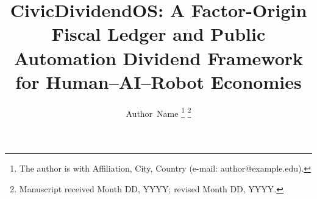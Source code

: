 \documentclass[journal]{IEEEtran}
\theoremstyle{plain}
\theoremstyle{definition}
\begin{document}
\title{CivicDividendOS: A Factor-Origin Fiscal Ledger and Public Automation Dividend Framework for Human--AI--Robot Economies}

\author{Author~Name%
\thanks{The author is with Affiliation, City, Country (e-mail: author@example.edu).}%
\thanks{Manuscript received Month DD, YYYY; revised Month DD, YYYY.}}


\maketitle

\begin{abstract}

\end{abstract}
\end{document}
